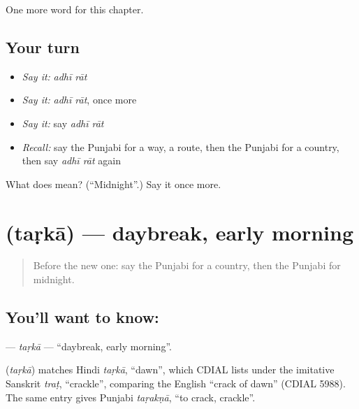 \begin{grammarlens}[title={What you've built}]
One more word for this chapter.
\end{grammarlens}

\subsection*{Your turn}
\begin{itemize}
\raggedright
  \item \emph{Say it:} \emph{adhī rāt}
  \item \emph{Say it:} \emph{adhī rāt}, once more
  \item \emph{Say it:} say \emph{adhī rāt}
  \item \emph{Recall:} say the Punjabi for a way, a route, then the Punjabi for a country, then say \emph{adhī rāt} again
\end{itemize}

\begin{tcolorbox}[breakable,colback=teal!4,colframe=teal!35!black,title={Before you move on}]
What does   mean? (\textquotedblleft{}Midnight\textquotedblright{}.) Say it once more.
\end{tcolorbox}
\section[\texorpdfstring{\pa{ਤੜਕਾ} (taṛkā)}{ਤੜਕਾ (taṛkā)}]{ (taṛkā) — daybreak, early morning}

\label{lesson:PA-C99-tarka}



\begin{quote}
Before the new one: say the Punjabi for a country, then the Punjabi for midnight.
\end{quote}

\subsection*{You'll want to know: }
\textbf{} — \emph{taṛkā} — \textquotedblleft{}daybreak, early morning\textquotedblright{}.

\begin{cousinweb}
\textbf{} (\emph{taṛkā}) matches Hindi \emph{taṛkā}, \textquotedblleft{}dawn\textquotedblright{}, which CDIAL lists under the imitative Sanskrit \emph{traṭ}, \textquotedblleft{}crackle\textquotedblright{}, comparing the English \textquotedblleft{}crack of dawn\textquotedblright{} (CDIAL 5988). The same entry gives Punjabi \emph{taṛakṇā}, \textquotedblleft{}to crack, crackle\textquotedblright{}.
\end{cousinweb}

